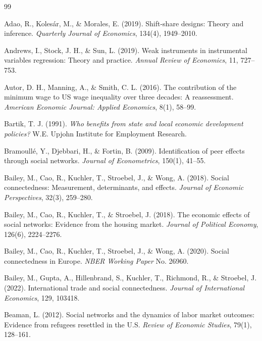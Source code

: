 \documentclass[12pt]{article}
\begin{document}
\begin{thebibliography}{99}

Adao, R., Koles{\'a}r, M., \& Morales, E. (2019).
Shift-share designs: Theory and inference.
\textit{Quarterly Journal of Economics}, 134(4), 1949--2010.

Andrews, I., Stock, J. H., \& Sun, L. (2019).
Weak instruments in instrumental variables regression: Theory and practice.
\textit{Annual Review of Economics}, 11, 727--753.

Autor, D. H., Manning, A., \& Smith, C. L. (2016).
The contribution of the minimum wage to US wage inequality over three decades: A reassessment.
\textit{American Economic Journal: Applied Economics}, 8(1), 58--99.

Bartik, T. J. (1991).
\textit{Who benefits from state and local economic development policies?}
W.E. Upjohn Institute for Employment Research.

Bramoull{\'e}, Y., Djebbari, H., \& Fortin, B. (2009).
Identification of peer effects through social networks.
\textit{Journal of Econometrics}, 150(1), 41--55.

Bailey, M., Cao, R., Kuchler, T., Stroebel, J., \& Wong, A. (2018).
Social connectedness: Measurement, determinants, and effects.
\textit{Journal of Economic Perspectives}, 32(3), 259--280.

Bailey, M., Cao, R., Kuchler, T., \& Stroebel, J. (2018).
The economic effects of social networks: Evidence from the housing market.
\textit{Journal of Political Economy}, 126(6), 2224--2276.

Bailey, M., Cao, R., Kuchler, T., Stroebel, J., \& Wong, A. (2020).
Social connectedness in Europe.
\textit{NBER Working Paper} No. 26960.

Bailey, M., Gupta, A., Hillenbrand, S., Kuchler, T., Richmond, R., \& Stroebel, J. (2022).
International trade and social connectedness.
\textit{Journal of International Economics}, 129, 103418.

Beaman, L. (2012).
Social networks and the dynamics of labor market outcomes: Evidence from refugees resettled in the U.S.
\textit{Review of Economic Studies}, 79(1), 128--161.


\end{thebibliography}
\end{document}
